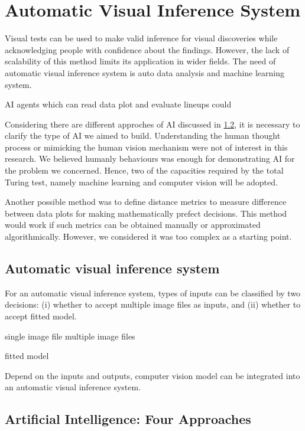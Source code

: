 \documentclass{monashthesis}
\theoremstyle{definition}
\theoremstyle{definition}
\theoremstyle{definition}
\theoremstyle{definition}
\theoremstyle{remark}
\begin{document}
\hypertarget{automatic-visual-inference-system}{%
\section{Automatic Visual Inference System}\label{automatic-visual-inference-system}}

Visual tests can be used to make valid inference for visual discoveries while acknowledging people with confidence about the findings. However, the lack of scalability of this method limits its application in wider fields. The need of automatic visual inference system is auto data analysis and machine learning system.

AI agents which can read data plot and evaluate lineups could

Considering there are different approches of AI discussed in \ref{se:ai}, it is necessary to clarify the type of AI we aimed to build. Understanding the human thought process or mimicking the human vision mechanism were not of interest in this research. We believed humanly behaviours was enough for demonstrating AI for the problem we concerned. Hence, two of the capacities required by the total Turing test, namely machine learning and computer vision will be adopted.

Another possible method was to define distance metrics to measure difference between data plots for making mathematically prefect decisions. This method would work if such metrics can be obtained manually or approximated algorithmically. However, we considered it was too complex as a starting point.

\hypertarget{automatic-visual-inference-system-1}{%
\subsection{Automatic visual inference system}\label{automatic-visual-inference-system-1}}

For an automatic visual inference system, types of inputs can be classified by two decisions: (i) whether to accept multiple image files as inputs, and (ii) whether to accept fitted model.

single image file
multiple image files

fitted model

Depend on the inputs and outputs, computer vision model can be integrated into an automatic visual inference system.

\hypertarget{se:ai}{%
\subsection{Artificial Intelligence: Four Approaches}\label{se:ai}}
\end{document}
